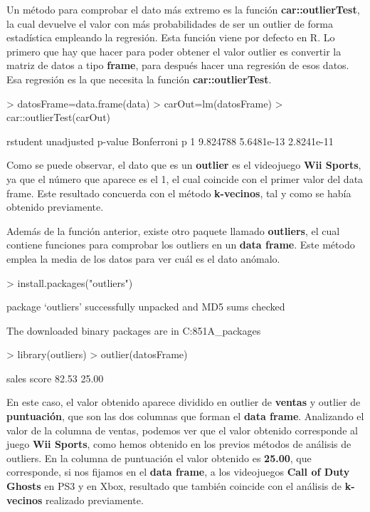\documentclass [a4paper] {article}
\begin{document}
Un método para comprobar el dato más extremo es la función \textbf{car::outlierTest}, la cual devuelve el valor con más probabilidades
de ser un outlier de forma estadística empleando la regresión. Esta función viene por defecto en R. 
Lo primero que hay que hacer para poder obtener el valor outlier es convertir la matriz de datos a tipo \textbf{frame}, para después hacer
una regresión de esos datos. Esa regresión es la que necesita la función \textbf{car::outlierTest}. 

\begin{Schunk}
\begin{Sinput}
> datosFrame=data.frame(data)
> carOut=lm(datosFrame)
> car::outlierTest(carOut)
\end{Sinput}
\begin{Soutput}
  rstudent unadjusted p-value Bonferroni p
1 9.824788         5.6481e-13   2.8241e-11
\end{Soutput}
\end{Schunk}

Como se puede observar, el dato que es un \textbf{outlier} es el videojuego \textbf{Wii Sports}, ya que el número que aparece es el 1,
el cual coincide con el primer valor del data frame. Este resultado concuerda con el método \textbf{k-vecinos}, tal y como se había 
obtenido previamente.

Además de la función anterior, existe otro paquete llamado \textbf{outliers}, el cual contiene funciones para comprobar los outliers en 
un \textbf{data frame}. Este método emplea la media de los datos para ver cuál es el dato anómalo. 

\begin{Schunk}
\begin{Sinput}
> install.packages("outliers")
\end{Sinput}
\begin{Soutput}
package ‘outliers’ successfully unpacked and MD5 sums checked

The downloaded binary packages are in
	C:\Users{}\AppData\Local\Temp\RtmpcP851A\downloaded_packages
\end{Soutput}
\begin{Sinput}
> library(outliers)
> outlier(datosFrame)
\end{Sinput}
\begin{Soutput}
sales score 
82.53 25.00 
\end{Soutput}
\end{Schunk}

En este caso, el valor obtenido aparece dividido en outlier de \textbf{ventas} y outlier de \textbf{puntuación}, que son las dos columnas 
que forman el \textbf{data frame}. Analizando el valor de la columna de ventas, podemos ver que el valor obtenido corresponde al juego 
\textbf{Wii Sports}, como hemos obtenido en los previos métodos de análisis de outliers. En la columna de puntuación el valor obtenido es
\textbf{25.00}, que corresponde, si nos fijamos en el \textbf{data frame}, a los videojuegos \textbf{Call of Duty Ghosts} en PS3 y en Xbox,
resultado que también coincide con el análisis de \textbf{k-vecinos} realizado previamente.
\end{document}
